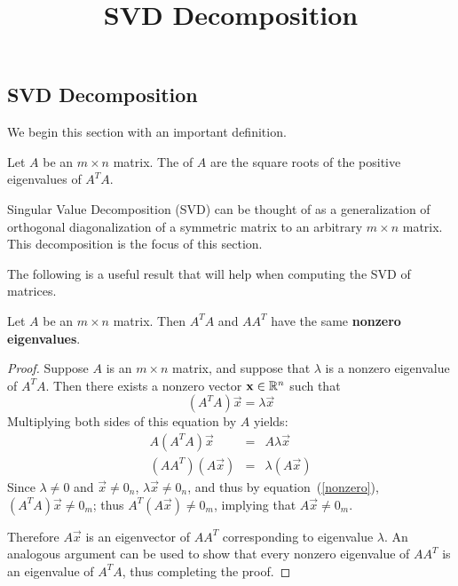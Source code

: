 \documentclass{ximera}
\title{SVD Decomposition} \license{CC BY-NC-SA 4.0}
\begin{document}
\begin{abstract}
\end{abstract}
\maketitle

\begin{onlineOnly}
\section*{SVD Decomposition}
\end{onlineOnly}

We begin this section with an important definition.

\begin{definition}\label{singularvalues}
Let $A$ be an $m\times n$ matrix. The  of $A$ are the square roots of the positive
eigenvalues of $A^TA.$ 
\end{definition}

Singular Value Decomposition (SVD) can be thought of as
a generalization of orthogonal diagonalization of a symmetric matrix
to an arbitrary $m\times n$ matrix. This decomposition is the focus of this section.

The following is a useful result that will help when computing the SVD of matrices.

\begin{lemma}\label{lem:samenonzeroeigenvalues}
Let $A$ be an $m \times n$ matrix. Then $A^TA$ and $AA^T$ have the same \textbf{nonzero eigenvalues}.
\end{lemma}

\begin{proof}
Suppose $A$ is an $m\times n$ matrix, and suppose that  $\lambda$ is a nonzero eigenvalue of $A^TA$.
Then there exists a nonzero vector $\mathbf{x} \in \mathbb{R}^n$ such that
\begin{equation}\label{nonzero}
(A^TA)\vec{x}=\lambda \vec{x}
\end{equation}
Multiplying both sides of this equation by $A$ yields:
\begin{eqnarray*}
A(A^TA)\vec{x} & = & A\lambda \vec{x}\\
(AA^T)(A\vec{x}) & = & \lambda (A\vec{x})
\end{eqnarray*}
Since $\lambda\neq 0$ and $\vec{x}\neq 0_n$, $\lambda \vec{x}\neq 0_n$,
and thus by equation~(\ref{nonzero}),
$(A^TA)\vec{x}\neq 0_m$; thus $A^T(A\vec{x})\neq 0_m$,
implying that $A\vec{x}\neq 0_m$.

Therefore $A\vec{x}$ is an eigenvector of $AA^T$ corresponding to eigenvalue
$\lambda$.  An analogous argument can be used to show that every
nonzero eigenvalue of $AA^T$ is an eigenvalue of $A^TA$, thus
completing the proof.
\end{proof}
\end{document}
